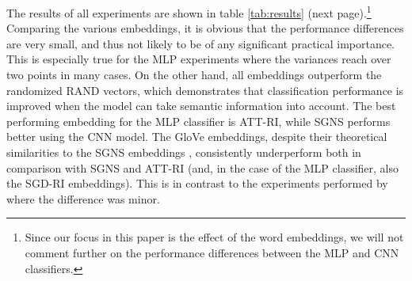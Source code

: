 \documentclass[11pt]{article}
\begin{document}
The results of all experiments are shown in table \ref{tab:results} (next page).\footnote{Since our focus in this paper is the effect of the word embeddings, we will not comment further on the performance differences between the MLP and CNN classifiers.}
Comparing the various embeddings, it is obvious that the performance differences are very small, and thus not likely to be of any significant practical importance. This is especially true for the MLP experiments where the variances reach over two points in many cases. On the other hand, all embeddings outperform the randomized RAND vectors, which demonstrates that classification performance is improved when the model can take semantic information into account. The best performing embedding for the MLP classifier is ATT-RI, while SGNS performs better using the CNN model. The GloVe embeddings, despite their theoretical similarities to the SGNS embeddings \cite{suzuki-nagata:2015:ACL-IJCNLP}, consistently underperform both in comparison with SGNS and ATT-RI (and, in the case of the MLP classifier, also the SGD-RI embeddings). This is in contrast to the experiments performed by \cite{ZhangWallace2015} where the difference was minor.
\end{document}
